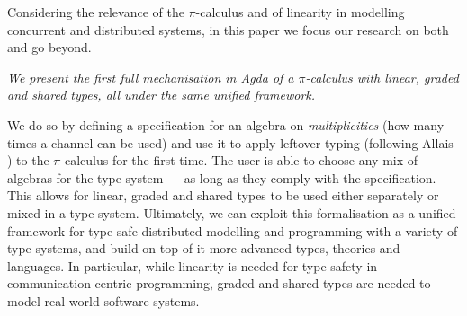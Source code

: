 \documentclass[a4paper,UKenglish,cleveref,autoref,thm-restate,authorcolumns]{lipics-v2019}
\theoremstyle{definition}
\newcommand{\picalc}{$\pi$-calculus}
\begin{document}
Considering the relevance of the \picalc{} and of linearity in modelling concurrent and distributed systems, in this paper we focus our research on both and go beyond.

\emph{We present the first full mechanisation in Agda of a \picalc{} with linear, graded and shared types, all under the same unified framework.}

We do so by defining a specification for an algebra on \emph{multiplicities} (how many times a channel can be used) and use it to apply leftover typing (following Allais \cite{Allais2018a}) to the \picalc{} for the first time.
The user is able to choose any mix of algebras for the type system --- as long as they comply with the specification.
This allows for linear, graded and shared types to be used either separately or mixed in a type system.
Ultimately, we can exploit this formalisation as a unified framework for type safe distributed modelling and programming with a variety of type systems, and build on top of it more advanced types, theories and languages.
In particular, while linearity is needed for type safety in communication-centric programming, graded and shared types are needed to model real-world software systems.
\end{document}

